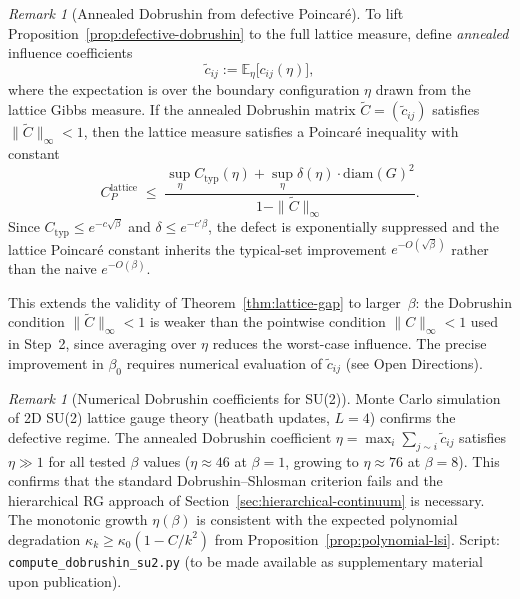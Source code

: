 \documentclass[12pt,a4paper]{article}
\theoremstyle{definition}
\theoremstyle{plain}
\theoremstyle{remark}
\newtheorem{remark}[definition]{Remark}
\begin{document}
\begin{remark}[Annealed Dobrushin from defective Poincar\'e]\label{rem:annealed-dobrushin}
To lift Proposition~\ref{prop:defective-dobrushin} to the full lattice measure, define \emph{annealed} influence coefficients
\begin{equation}\label{eq:annealed-influence}
  \tilde{c}_{ij} := \mathbb{E}_\eta\bigl[c_{ij}(\eta)\bigr],
\end{equation}
where the expectation is over the boundary configuration $\eta$ drawn from the lattice Gibbs measure. If the annealed Dobrushin matrix $\tilde{C} = (\tilde{c}_{ij})$ satisfies $\|\tilde{C}\|_\infty < 1$, then the lattice measure satisfies a Poincar\'e inequality with constant
\begin{equation}\label{eq:annealed-poincare}
  C_P^{\mathrm{lattice}} \;\leq\; \frac{\sup_\eta C_{\mathrm{typ}}(\eta) + \sup_\eta \delta(\eta) \cdot \mathrm{diam}(G)^2}{1 - \|\tilde{C}\|_\infty}.
\end{equation}
Since $C_{\mathrm{typ}} \leq e^{-c\sqrt{\beta}}$ and $\delta \leq e^{-c'\beta}$, the defect is exponentially suppressed and the lattice Poincar\'e constant inherits the typical-set improvement $e^{-O(\sqrt{\beta})}$ rather than the naive $e^{-O(\beta)}$.

This extends the validity of Theorem~\ref{thm:lattice-gap} to larger~$\beta$: the Dobrushin condition $\|\tilde{C}\|_\infty < 1$ is weaker than the pointwise condition $\|C\|_\infty < 1$ used in Step~2, since averaging over $\eta$ reduces the worst-case influence. The precise improvement in $\beta_0$ requires numerical evaluation of $\tilde{c}_{ij}$ (see Open Directions).
\end{remark}

\begin{remark}[Numerical Dobrushin coefficients for SU(2)]
\label{rem:dobrushin-numerics}
Monte Carlo simulation of 2D SU(2) lattice gauge theory (heatbath updates, $L=4$) confirms the defective regime. The annealed Dobrushin coefficient $\eta = \max_i \sum_{j \sim i} \tilde{c}_{ij}$ satisfies $\eta \gg 1$ for all tested $\beta$ values ($\eta \approx 46$ at $\beta=1$, growing to $\eta \approx 76$ at $\beta=8$). This confirms that the standard Dobrushin--Shlosman criterion fails and the hierarchical RG approach of Section~\ref{sec:hierarchical-continuum} is necessary. The monotonic growth $\eta(\beta)$ is consistent with the expected polynomial degradation $\kappa_k \geq \kappa_0(1 - C/k^2)$ from Proposition~\ref{prop:polynomial-lsi}. Script: \texttt{compute\_dobrushin\_su2.py} (to be made available as supplementary material upon publication).
\end{remark}
\end{document}
